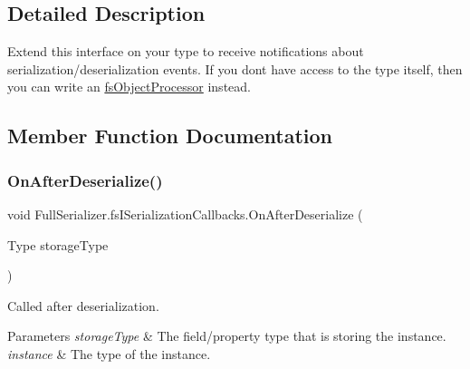 \subsection{Detailed Description}
Extend this interface on your type to receive notifications about serialization/deserialization events. If you don\textquotesingle{}t have access to the type itself, then you can write an \hyperlink{class_full_serializer_1_1fs_object_processor}{fs\+Object\+Processor} instead. 



\subsection{Member Function Documentation}
\mbox{\label{interface_full_serializer_1_1fs_i_serialization_callbacks_a02ea7926810ee12b131e62a8a8d9e931}} 
\subsubsection{\texorpdfstring{On\+After\+Deserialize()}{OnAfterDeserialize()}}
{\footnotesize\ttfamily void Full\+Serializer.\+fs\+I\+Serialization\+Callbacks.\+On\+After\+Deserialize (\begin{DoxyParamCaption}\item[{Type}]{storage\+Type }\end{DoxyParamCaption})}



Called after deserialization. 


\begin{DoxyParams}{Parameters}
{\em storage\+Type} & The field/property type that is storing the instance.\\
\hline
{\em instance} & The type of the instance.\\
\hline
\end{DoxyParams}
\mbox{\label{interface_full_serializer_1_1fs_i_serialization_callbacks_ae5780792dded246dabf71cf38f22d1ac}} 
